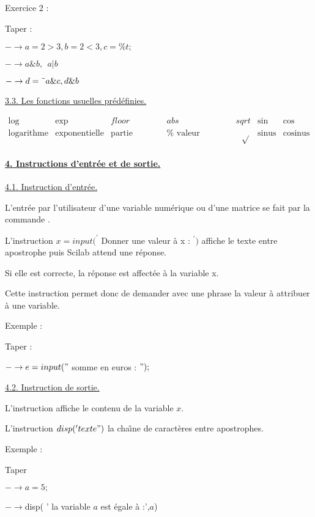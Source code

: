 \documentclass{article}
\begin{document}
Exercice 2 :

Taper :

$-\rightarrow a=2>3,b=2<3,c=\%t;$

$-\rightarrow a\&b,\ \ a|b$

$-\rightarrow d=\symbol{126}a\&c,d\&b$

\underline{3.3. Les fonctions usuelles pr\'{e}d\'{e}finies.}

$%
\begin{array}{ccccccc}
\log & \exp & floor & abs & sqrt & \sin & \cos \\ 
\text{logarithme} & \text{exponentielle} & \text{partie enti\`{e}re} & \text{%
valeur absolue} & \text{ }\sqrt{} & \text{sinus} & \text{cosinus}%
\end{array}%
$

\bigskip

\paragraph{\protect\underline{4. Instructions d'entr\'{e}e et de sortie.}}

\underline{4.1. Instruction d'entr\'{e}e.}

L'entr\'{e}e par l'utilisateur d'une variable num\'{e}rique ou d'une matrice
se fait par la commande $.$

L'instruction $x=input(^{\prime }$ Donner une valeur \`{a} x : $^{\prime })$
affiche le texte entre apostrophe puis Scilab attend une r\'{e}ponse.

Si elle est correcte, la r\'{e}ponse est affect\'{e}e \`{a} la variable x.

Cette instruction permet donc de demander avec une phrase la valeur \`{a}
attribuer \`{a} une variable.

Exemple :

Taper :

$-\rightarrow e=input("$ somme en euros : $");$

\underline{4.2. Instruction de sortie.}

L'instruction  affiche le contenu de la variable $x.$

L'instruction $disp(^{\prime }texte")$ la cha\^{\i}ne de caract\`{e}res
entre apostrophes.

Exemple :

Taper

$-\rightarrow a=5;$

$-\rightarrow $disp( ' la variable $a$ est \'{e}gale \`{a} :',$a$)
\end{document}

